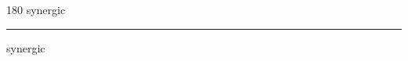 
\begin{frame}
\begin{center}
\begin{turn}{180}
{\fontsize{2.5cm}{1em}\selectfont synergic}
\end{turn}
\vspace{1em}\par  
\hrule
\vspace{1em}\par  
{\fontsize{2.5cm}{1em}\selectfont synergic}
\end{center}
\end{frame}
